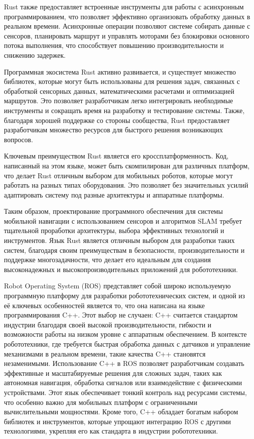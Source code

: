Rust также предоставляет встроенные инструменты для работы с асинхронным
программированием, что позволяет эффективно организовать обработку данных в
реальном времени. Асинхронные операции позволяют системе собирать данные с
сенсоров, планировать маршрут и управлять моторами без блокировки основного
потока выполнения, что способствует повышению производительности и снижению
задержек.

Программная экосистема Rust активно развивается, и существует множество
библиотек, которые могут быть использованы для решения задач, связанных с
обработкой сенсорных данных, математическими расчетами и оптимизацией маршрутов.
Это позволяет разработчикам легко интегрировать необходимые инструменты и
сокращать время на разработку и тестирование системы. Также, благодаря хорошей
поддержке со стороны сообщества, Rust предоставляет разработчикам множество
ресурсов для быстрого решения возникающих вопросов.

Ключевым преимуществом Rust является его кроссплатформенность. Код, написанный
на этом языке, может быть скомпилирован для различных платформ, что делает Rust
отличным выбором для мобильных роботов, которые могут работать на разных типах
оборудования. Это позволяет без значительных усилий адаптировать систему под
разные архитектуры и аппаратные платформы.

Таким образом, проектирование программного обеспечения для системы мобильной
навигации с использованием сенсоров и алгоритмов SLAM требует тщательной
проработки архитектуры, выбора эффективных технологий и инструментов. Язык Rust
является отличным выбором для разработки таких систем, благодаря своим
преимуществам в безопасности, производительности и поддержке многозадачности,
что делает его идеальным для создания высоконадежных и высокопроизводительных
приложений для робототехники.

Robot Operating System (ROS) представляет собой широко используемую программную
платформу для разработки робототехнических систем, и одной из её ключевых
особенностей является то, что она написана на языке программирования C++. Этот
выбор не случаен: C++ считается стандартом индустрии благодаря своей высокой
производительности, гибкости и возможности работы на низком уровне с аппаратным
обеспечением. В контексте робототехники, где требуется быстрая обработка данных
с датчиков и управление механизмами в реальном времени, такие качества C++
становятся незаменимыми. Использование C++ в ROS позволяет разработчикам
создавать эффективные и масштабируемые решения для сложных задач, таких как
автономная навигация, обработка сигналов или взаимодействие с физическими
устройствами. Этот язык обеспечивает тонкий контроль над ресурсами системы, что
особенно важно для мобильных платформ с ограниченными вычислительными
мощностями. Кроме того, C++ обладает богатым набором библиотек и инструментов,
которые упрощают интеграцию ROS с другими технологиями, укрепляя его как
стандарта в индустрии робототехники.

